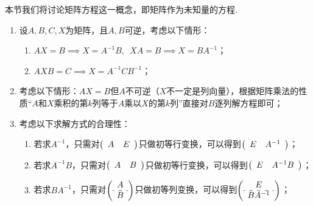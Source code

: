 本节我们将讨论矩阵方程这一概念，即矩阵作为未知量的方程.
\begin{enumerate}
    \item 设$A,B,C,X$为矩阵，且$A,B$可逆，考虑以下情形：
          \begin{enumerate}
              \item $AX=B \implies X=A^{-1}B, \enspace XA=B \implies X=BA^{-1}$；

              \item $AXB=C \implies X=A^{-1}CB^{-1}$；
          \end{enumerate}

    \item 考虑以下情形：$AX=B$但$A$不可逆（$X$不一定是列向量），根据矩阵乘法的性质``$A$和$X$乘积的第$k$列等于$A$乘以$X$的第$k$列''直接对$B$逐列解方程即可；

    \item 考虑以下求解方式的合理性：
          \begin{enumerate}
              \item 若求$A^{-1}$，只需对$\left(\begin{array}{c:c}
                                A & E
                            \end{array}\right)$只做初等行变换，可以得到$\left(\begin{array}{c:c}
                                E & A^{-1}
                            \end{array}\right)$；

              \item 若求$A^{-1}B$，只需对$\left(\begin{array}{c:c}
                                A & B
                            \end{array}\right)$只做初等行变换，可以得到$\left(\begin{array}{c:c}
                                E & A^{-1}B
                            \end{array}\right)$；

              \item 若求$BA^{-1}$，只需对$\left(\begin{array}{c}
                                A \\ \hdashline B
                            \end{array}\right)$只做初等列变换，可以得到$\left(\begin{array}{c}
                                E \\ \hdashline BA^{-1}
                            \end{array}\right)$；


\end{enumerate}
\end{enumerate}
